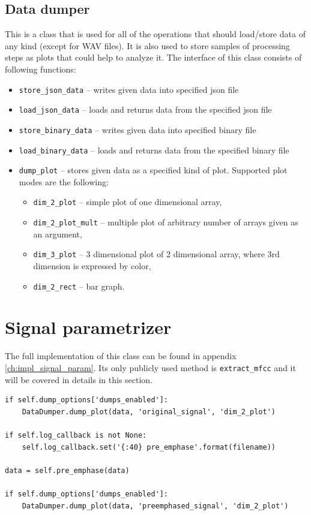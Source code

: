 \documentclass[magister]{dyplom}
\begin{document}
	\subsection{Data dumper}
	
	This is a class that is used for all of the operations that should load/store data of any kind (except for \gls{WAV} files). It is also used to store samples of processing steps as plots that could help to analyze it. The interface of this class consists of following functions:
	
	\begin{itemize}
		\item \texttt{store\_json\_data} -- writes given data into specified json file
		\item \texttt{load\_json\_data} -- loads and returns data from the specified json file
		\item \texttt{store\_binary\_data} -- writes given data into specified binary file
		\item \texttt{load\_binary\_data} -- loads and returns data from the specified binary file
		\item \texttt{dump\_plot} -- stores given data as a specified kind of plot. Supported plot modes are the following:
		\begin{itemize}
			\item \texttt{dim\_2\_plot} -- simple plot of one dimensional array,
			\item \texttt{dim\_2\_plot\_mult} -- multiple plot of arbitrary number of arrays given as an argument,
			\item \texttt{dim\_3\_plot} -- 3 dimensional plot of 2 dimensional array, where 3rd dimension is expressed by color,
			\item \texttt{dim\_2\_rect} -- bar graph.
			
		\end{itemize}
	\end{itemize}
	
	\section{Signal parametrizer}
	
	The full implementation of this class can be found in appendix \ref{ch:impl_signal_param}. Its only publicly used method is \texttt{extract\_mfcc} and it will be covered in details in this section.\\
	
	\begingroup
	\begin{verbatim}
if self.dump_options['dumps_enabled']:
    DataDumper.dump_plot(data, 'original_signal', 'dim_2_plot')

if self.log_callback is not None:
    self.log_callback.set('{:40} pre_emphase'.format(filename))
	
data = self.pre_emphase(data)

if self.dump_options['dumps_enabled']:
    DataDumper.dump_plot(data, 'preemphased_signal', 'dim_2_plot')
	\end{verbatim}
	\endgroup
	\vspace{1em}
	
\end{document}

